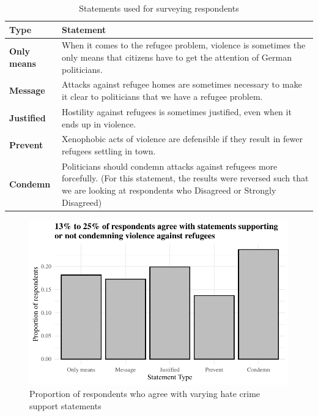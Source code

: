 \documentclass[
]{article}
\begin{document}
\clearpage

\hypertarget{tbl-stmt}{}
\begin{table}
\caption{\label{tbl-stmt}Statements used for surveying respondents }\tabularnewline

\centering
\begin{tabular}{>{\raggedright\arraybackslash}p{7em}>{\raggedright\arraybackslash}p{35em}}
\toprule
Type & Statement\\
\midrule
\textbf{Only means} & When it comes to the refugee problem, violence is sometimes the only means that citizens have to get the attention of German politicians.\\
\textbf{Message} & Attacks against refugee homes are sometimes necessary to make it clear to politicians that we have a refugee problem.\\
\textbf{Justified} & Hostility against refugees is sometimes justified, even when it ends up in violence.\\
\textbf{Prevent} & Xenophobic acts of violence are defensible if they result in fewer refugees settling in town.\\
\textbf{Condemn} & Politicians should condemn attacks against refugees more forcefully. (For this statement, the results were reversed such that we are looking at respondents who Disagreed or Strongly Disagreed)\\
\bottomrule
\end{tabular}
\end{table}

\begin{figure}

{\centering \includegraphics{paper_files/figure-pdf/fig-statements-1.pdf}

}

\caption{\label{fig-statements}Proportion of respondents who agree with
varying hate crime support statements}

\end{figure}
\end{document}
